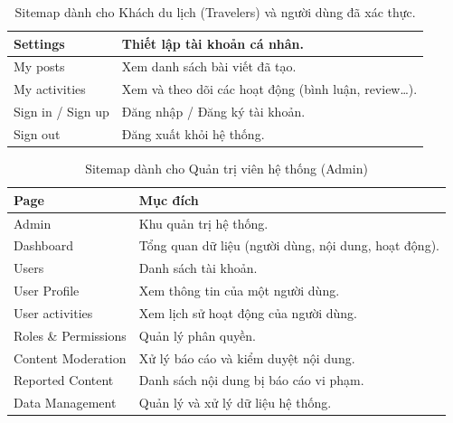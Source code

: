 \begin{table}[H]
\begin{tabular}{|p{5cm}|p{10cm}|}
Settings            & Thiết lập tài khoản cá nhân.                            \\ \hline
My posts            & Xem danh sách bài viết đã tạo.                          \\ \hline
My activities       & Xem và theo dõi các hoạt động (bình luận, review…).     \\ \hline
Sign in / Sign up   & Đăng nhập / Đăng ký tài khoản.                          \\ \hline
Sign out            & Đăng xuất khỏi hệ thống.                                \\ \hline
\end{tabular}
\caption{Sitemap dành cho Khách du lịch (Travelers) và người dùng đã xác thực.}
\label{tab:travelers}
\end{table}

\begin{table}[H]
\centering
\begin{tabular}{|p{5cm}|p{10cm}|}
\hline
Page                 & Mục đích                                             \\ \hline
Admin                & Khu quản trị hệ thống.                               \\ \hline
Dashboard            & Tổng quan dữ liệu (người dùng, nội dung, hoạt động). \\ \hline
Users                & Danh sách tài khoản.                                 \\ \hline
User Profile         & Xem thông tin của một người dùng.                    \\ \hline
User activities      & Xem lịch sử hoạt động của người dùng.                \\ \hline
Roles \& Permissions & Quản lý phân quyền.                                  \\ \hline
Content Moderation   & Xử lý báo cáo và kiểm duyệt nội dung.                \\ \hline
Reported Content     & Danh sách nội dung bị báo cáo vi phạm.               \\ \hline
Data Management      & Quản lý và xử lý dữ liệu hệ thống.                   \\ \hline
\end{tabular}
\caption{Sitemap dành cho Quản trị viên hệ thống (Admin)}
\label{tab:admin}
\end{table}

